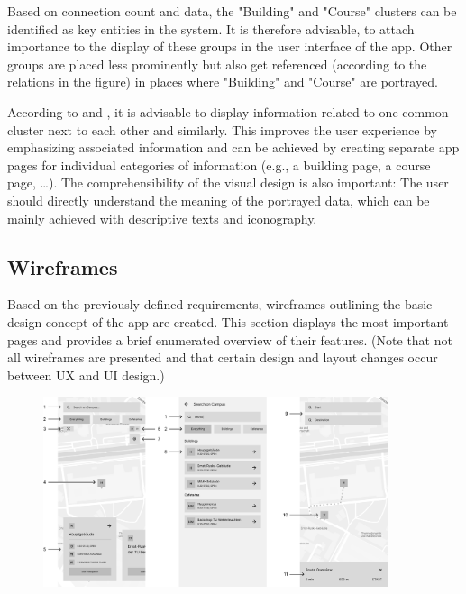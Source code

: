 Based on connection count and data, the "Building" and "Course" clusters can be identified as key entities in the system. It is therefore advisable, to attach importance to the display of these groups in the user interface of the app. Other groups are placed less prominently but also get referenced (according to the relations in the figure) in places where "Building" and "Course" are portrayed.

According to \cite{law_of_common_region} and \cite{law_of_similarity}, it is advisable to display information related to one common cluster next to each other and similarly. This improves the user experience by emphasizing associated information and can be achieved by creating separate app pages for individual categories of information (e.g., a building page, a course page, \ldots). The comprehensibility of the visual design is also important: The user should directly understand the meaning of the portrayed data, which can be mainly achieved with descriptive texts and iconography.

\newpage

\subsection{Wireframes}
Based on the previously defined requirements, wireframes outlining the basic design concept of the app are created. This section displays the most important pages and provides a brief enumerated overview of their features. (Note that not all wireframes are presented and that certain design and layout changes occur between UX and UI design.)

\begin{figure}[H]
	\centering
	\includegraphics[width=0.9\textwidth]{images/wireframes_1.png}\\
\end{figure}

